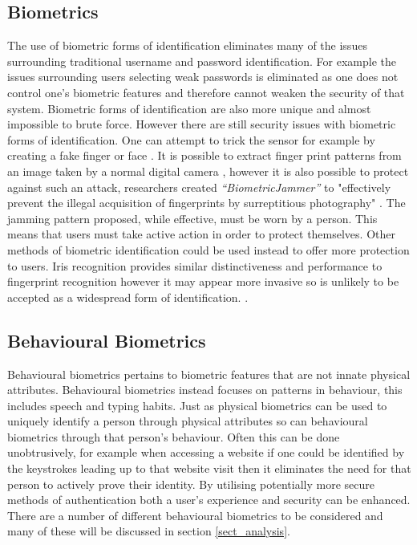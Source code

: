 \documentclass[12pt]{article}
\begin{document}
	\subsection{Biometrics}
	\label{subsect_biometrics}
	The use of biometric forms of identification eliminates many of the issues surrounding traditional username and password identification. For example the issues surrounding users selecting weak passwords is eliminated as one does not control one's biometric features and therefore cannot weaken the security of that system. Biometric forms of identification are also more unique and almost impossible to brute force.
	However there are still security issues with biometric forms of identification. One can attempt to trick the sensor for example by creating a fake finger or face \citep{ambalakat2005security}. It is possible to extract finger print patterns from an image taken by a normal digital camera \citep{ogane2017biometric}, however it is also possible to protect against such an attack, researchers created \emph{``BiometricJammer''} to "effectively prevent the illegal acquisition of fingerprints by surreptitious photography" \citep{ogane2017biometric}. The jamming pattern proposed, while effective, must be worn by a person. This means that users must take active action in order to protect themselves. Other methods of biometric identification could be used instead to offer more protection to users.
	Iris recognition provides similar distinctiveness and performance to fingerprint recognition however it may appear more invasive so is unlikely to be accepted as a widespread form of identification. \citep{ambalakat2005security}.
	\subsection{Behavioural Biometrics}
	\label{subsect_behavioral_biometrics}
	Behavioural biometrics pertains to biometric features that are not innate physical attributes. Behavioural biometrics instead focuses on patterns in behaviour, this includes speech and typing habits. Just as physical biometrics can be used to uniquely identify a person through physical attributes so can behavioural biometrics through that person's behaviour. Often this can be done unobtrusively, for example when accessing a website if one could be identified by the keystrokes leading up to that website visit then it eliminates the need for that person to actively prove their identity. By utilising potentially more secure methods of authentication both a user's experience and security can be enhanced. There are a number of different behavioural biometrics to be considered and many of these will be discussed in section \ref{sect_analysis}.
	
\end{document}
